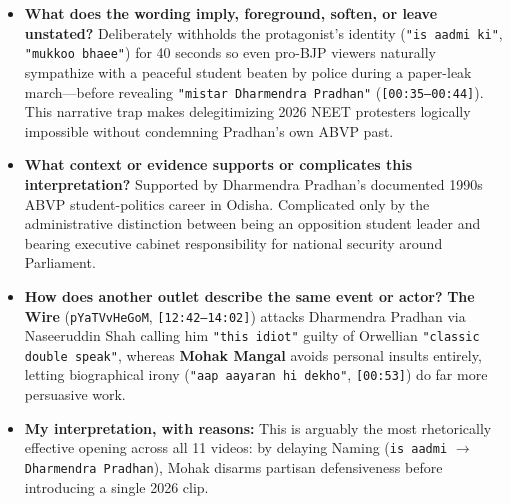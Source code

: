 \documentclass[10pt,a4paper]{article}
\begin{document}
\begin{itemize}[leftmargin=1.5em, itemsep=3pt, topsep=4pt]
  \item \textbf{What does the wording imply, foreground, soften, or leave unstated?} Deliberately withholds the protagonist's identity (\texttt{"is aadmi ki"}, \texttt{"mukkoo bhaee"}) for 40 seconds so even pro-BJP viewers naturally sympathize with a peaceful student beaten by police during a paper-leak march---before revealing \texttt{"mistar Dharmendra Pradhan"} (\texttt{[00:35--00:44]}). This narrative trap makes delegitimizing 2026 NEET protesters logically impossible without condemning Pradhan's own ABVP past.
  \item \textbf{What context or evidence supports or complicates this interpretation?} Supported by Dharmendra Pradhan's documented 1990s ABVP student-politics career in Odisha. Complicated only by the administrative distinction between being an opposition student leader and bearing executive cabinet responsibility for national security around Parliament.
  \item \textbf{How does another outlet describe the same event or actor?} \textbf{The Wire} (\texttt{pYaTVvHeGoM}, \texttt{[12:42--14:02]}) attacks Dharmendra Pradhan via Naseeruddin Shah calling him \texttt{"this idiot"} guilty of Orwellian \texttt{"classic double speak"}, whereas \textbf{Mohak Mangal} avoids personal insults entirely, letting biographical irony (\texttt{"aap aayaran hi dekho"}, \texttt{[00:53]}) do far more persuasive work.
  \item \textbf{My interpretation, with reasons:} This is arguably the most rhetorically effective opening across all 11 videos: by delaying Naming (\texttt{is aadmi} $\rightarrow$ \texttt{Dharmendra Pradhan}), Mohak disarms partisan defensiveness before introducing a single 2026 clip.
\end{itemize}
\end{document}

